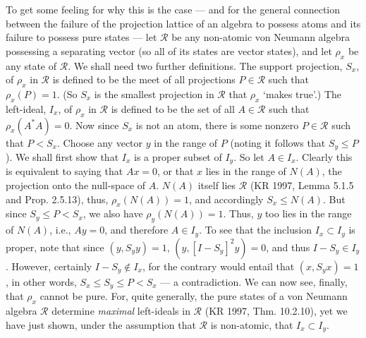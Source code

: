 \documentclass[12pt]{article}
\newcommand{\alg}[1]{\mbox{$\mathcal{#1}$}}
\begin{document}
 To get some feeling for why this is the case --- and for the general 
 connection between the failure of the projection lattice of an 
 algebra to possess atoms and its failure to 
 possess pure states --- let $\alg{R}$ be any non-atomic von Neumann algebra 
 possessing a separating vector (so all of its states are vector states), and let $\rho_{x}$ be any state of 
 $\alg{R}$.  We shall need two further definitions.  The support projection, 
 $S_{x}$, of $\rho_{x}$ in 
 $\alg{R}$ is defined to be the meet of all projections $P\in\alg{R}$ 
 such that $\rho_{x}(P)=1$.  (So $S_{x}$ is the smallest projection 
 in $\alg{R}$ that $\rho_{x}$ `makes true'.)  The 
 left-ideal, $I_{x}$, of $\rho_{x}$ in $\alg{R}$ is defined to 
 be the set of all $A\in\alg{R}$ such that $\rho_{x}(A^{*}A)=0$.   
 Now since $S_{x}$ 
 is not an atom, there is some nonzero $P\in\alg{R}$ such that $P<S_{x}$. 
 Choose any vector $y$ in the range of $P$ (noting it follows that 
 $S_{y}\leq P$).  We shall first show that $I_{x}$ is a proper subset of 
 $I_{y}$.   So let $A\in	I_{x}$.	 Clearly this is equivalent to saying 
 that $Ax=0$, or that $x$ lies in the range of $N(A)$, the projection onto the null-space of $A$.  
 $N(A)$ itself lies $\alg{R}$ (KR 1997, Lemma 5.1.5 and Prop. 2.5.13), 
 thus, $\rho_{x}(N(A))=1$, and accordingly $S_{x}\leq N(A)$.   
 But since $S_{y}\leq P<S_{x}$, we also have	$\rho_{y}(N(A))=1$.  Thus,	
 $y$ too lies in the range of $N(A)$, i.e., $Ay=0$, and therefore $A\in 
 I_{y}$. To see that the inclusion $I_{x}\subset I_{y}$ is 
 proper, note that since $(y,S_{y}y)=1$, $(y,[I-S_{y}]^{2}y)=0$, and thus 
 $I-S_{y}\in I_{y}$.  However, certainly $I-S_{y}\not\in I_{x}$, for the 
 contrary would entail that 
 $(x,S_{y}x)=1$, in other words, $S_{x}\leq S_{y}\leq P<S_{x}$ --- a 
 contradiction.  We can now see, finally, that 
 $\rho_{x}$ cannot be pure.  For, quite generally, the pure states of a von Neumann 
 algebra $\alg{R}$ determine \emph{maximal} left-ideals in 
 $\alg{R}$ (KR 1997, Thm. 10.2.10), yet we have just shown, under the 
 assumption that $\alg{R}$ is non-atomic, that $I_{x}\subset I_{y}$. 
 
\end{document}
